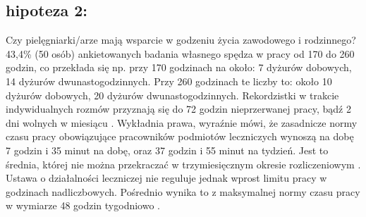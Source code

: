 \documentclass[a4paper,12pt,twoside,openany]{report}
\begin{document}

\subsection*{hipoteza 2:} 

Czy  pielęgniarki/arze mają wsparcie w godzeniu życia zawodowego i rodzinnego? 
 43,4\%  (50 osób) ankietowanych badania własnego spędza w pracy od 170 do 260 godzin, co przekłada się np. przy 170 godzinach na około:  7 dyżurów dobowych, 14 dyżurów dwunastogodzinnych. Przy 260 godzinach te liczby to: około  10 dyżurów dobowych,  20 dyżurów dwunastogodzinnych. Rekordzistki w trakcie indywidualnych rozmów przyznają się do 72 godzin nieprzerwanej pracy, bądź 2 dni wolnych w miesiącu \cite{cyfrowe}.  Wykładnia prawa, wyraźnie mówi, że zasadnicze normy czasu pracy obowiązujące pracowników podmiotów leczniczych wynoszą na dobę 7 godzin i 35 minut na dobę, oraz 37 godzin i 55 minut na tydzień. Jest to średnia, której nie można przekraczać w trzymiesięcznym okresie rozliczeniowym \cite{okres}. Ustawa o działalności leczniczej nie reguluje  jednak wprost limitu pracy w godzinach nadliczbowych. Pośrednio wynika to z maksymalnej normy czasu pracy w wymiarze 48 godzin tygodniowo \cite{klauzula}.
\end{document}
